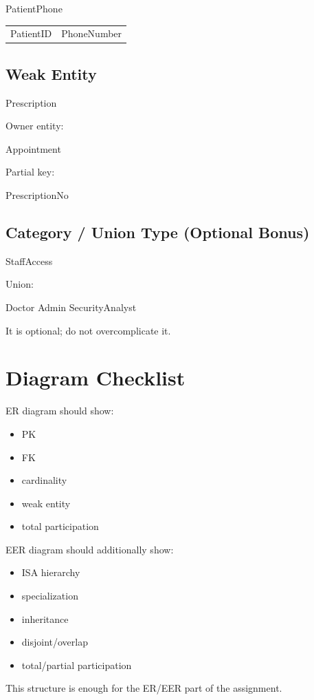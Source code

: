 PatientPhone

\begin{tabular}{ll}
PatientID & PhoneNumber \\
\end{tabular}

\subsection*{Weak Entity}

Prescription

Owner entity:

Appointment

Partial key:

PrescriptionNo
\subsection*{Category / Union Type (Optional Bonus)}
StaffAccess

Union:

Doctor
Admin
SecurityAnalyst

It is optional; do not overcomplicate it.

\section{Diagram Checklist}
ER diagram should show:
\begin{itemize}
    \item PK
    \item FK
    \item cardinality
    \item weak entity
    \item total participation
\end{itemize}

EER diagram should additionally show:
\begin{itemize}
    \item ISA hierarchy
    \item specialization
    \item inheritance
    \item disjoint/overlap
    \item total/partial participation
\end{itemize}

This structure is enough for the ER/EER part of the assignment.


